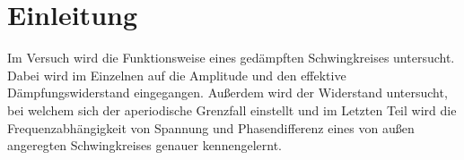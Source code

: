 \section{Einleitung}
Im Versuch wird die Funktionsweise eines gedämpften Schwingkreises untersucht. Dabei wird im Einzelnen auf die Amplitude und den effektive Dämpfungswiderstand
eingegangen. Außerdem wird der Widerstand untersucht, bei welchem sich der aperiodische Grenzfall einstellt und im Letzten Teil wird die Frequenzabhängigkeit
von Spannung und Phasendifferenz eines von außen angeregten Schwingkreises genauer kennengelernt.
